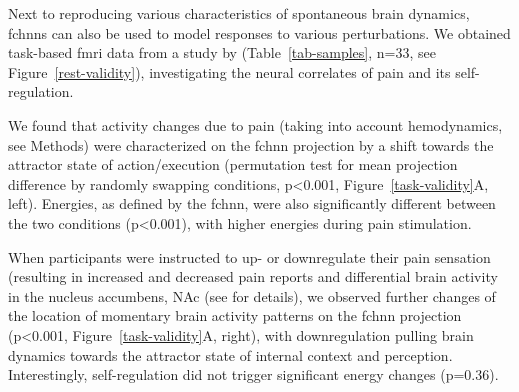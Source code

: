 \documentclass{article}
\begin{document}
Next to reproducing various characteristics of spontaneous brain dynamics, \acrshort{fchnn}s can also be used to model responses to various perturbations. We obtained task-based \acrshort{fmri} data from a study by \citet{woo2015distinct} (Table~\ref{tab-samples}, n=33, see Figure~\ref{rest-validity}), investigating the neural correlates of pain and its self-regulation.

We found that activity changes due to pain (taking into account hemodynamics, see Methods) were characterized on the \acrshort{fchnn} projection by a shift towards the attractor state of action/execution (permutation test for mean projection difference by randomly swapping conditions, p\textless 0.001, Figure~\ref{task-validity}A, left). Energies, as defined by the \acrshort{fchnn}, were also significantly different between the two conditions (p\textless 0.001), with higher energies during pain stimulation.

When participants were instructed to up- or downregulate their pain sensation (resulting in increased and decreased pain reports and differential brain activity in the nucleus accumbens, NAc (see \cite{woo2015distinct} for details), we observed further changes of the location of momentary brain activity patterns on the \acrshort{fchnn} projection (p\textless 0.001, Figure~\ref{task-validity}A, right), with downregulation pulling brain dynamics towards the attractor state of internal context and perception. Interestingly, self-regulation did not trigger significant energy changes (p=0.36).
\end{document}
